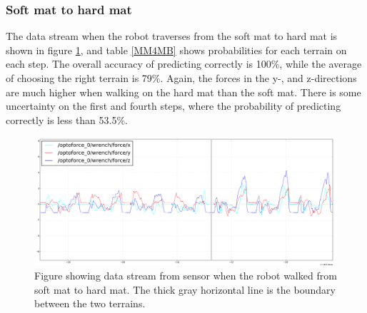 \documentclass[USenglish]{ifimaster}  %
\begin{document}
\subsubsection{Soft mat to hard mat}
The data stream when the robot traverses from the soft mat to hard mat is shown in figure \ref{fig:MM_4_Resten_BGraf}, and table \ref{MM4MB} shows probabilities for each terrain on each step. The overall accuracy of predicting correctly is 100\%, while the average of choosing the right terrain is 79\%. Again, the forces in the y-, and z-directions are much higher when walking on the hard mat than the soft mat. There is some uncertainty on the first and fourth steps, where the probability of predicting correctly is less than 53.5\%.

	\begin{figure}[h]
		\centering
		\includegraphics[width=\textwidth,height=\textheight,keepaspectratio]{Figures/MM_4Resten_MB_line2}
		\caption[Data stream of the transition from soft mat to hard mat]{Figure showing data stream from sensor when the robot walked from soft mat to hard mat. The thick gray horizontal line is the boundary between the two terrains.}
		\label{fig:MM_4_Resten_BGraf}
	\end{figure}
	
	\begin{table}[h]
		\centering
		\caption[Results of transistion from soft mat to hard mat]{Estimated probability of each terrain per step walking from soft mat to hard mat. Values are marked green to represent correct predictions. For incorrect predictions, the actual value is marked yellow while the predicted value is marked red.}
		\label{MM4MB}
	\end{table}
	\FloatBarrier
	\clearpage
\end{document}
